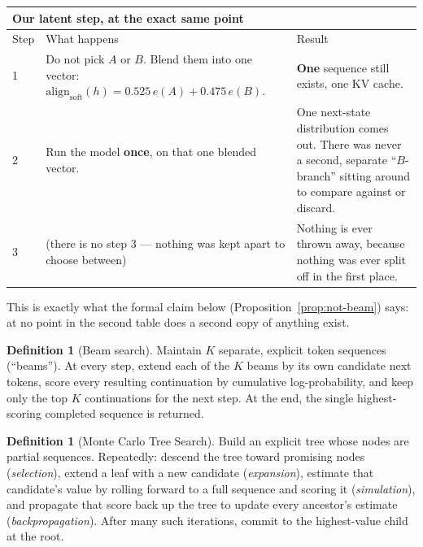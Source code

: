 \documentclass[11pt]{article}
\theoremstyle{definition}
\newtheorem{definition}[theorem]{Definition}
\begin{document}
\begin{center}
\small
\begin{tabular}{@{}p{}p{}p{}@{}}
\toprule
\multicolumn{3}{l}{\textbf{Our latent step, at the exact same point}} \\
\midrule
Step & What happens & Result \\
\midrule
1 & Do not pick $A$ or $B$. Blend them into one vector:
  $\mathrm{align}_{\mathrm{soft}}(h) = 0.525\,e(A) + 0.475\,e(B)$. &
  \textbf{One} sequence still exists, one KV cache. \\
2 & Run the model \textbf{once}, on that one blended vector. &
  One next-state distribution comes out. There was never a second, separate
  ``$B$-branch'' sitting around to compare against or discard. \\
3 & (there is no step 3 --- nothing was kept apart to choose between) &
  Nothing is ever thrown away, because nothing was ever split off in the
  first place. \\
\bottomrule
\end{tabular}
\end{center}

\begin{center}
\end{center}

This is exactly what the formal claim below (Proposition~\ref{prop:not-beam}) says: at no point in the second table does a second copy of anything exist.

\begin{definition}[Beam search]
Maintain $K$ separate, explicit token sequences (``beams''). At every step, extend each of the $K$ beams by its own candidate next tokens, score every resulting continuation by cumulative log-probability, and keep only the top $K$ continuations for the next step. At the end, the single highest-scoring completed sequence is returned.
\end{definition}

\begin{definition}[Monte Carlo Tree Search]
Build an explicit tree whose nodes are partial sequences. Repeatedly: descend the tree toward promising nodes (\emph{selection}), extend a leaf with a new candidate (\emph{expansion}), estimate that candidate's value by rolling forward to a full sequence and scoring it (\emph{simulation}), and propagate that score back up the tree to update every ancestor's estimate (\emph{backpropagation}). After many such iterations, commit to the highest-value child at the root.
\end{definition}
\end{document}
